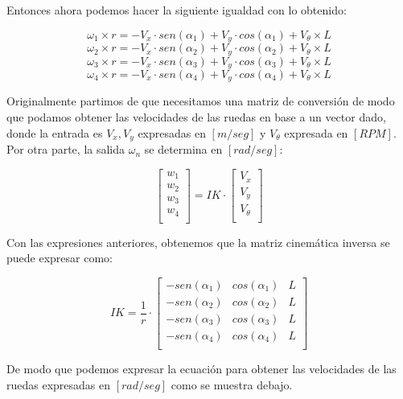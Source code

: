 Entonces ahora podemos hacer la siguiente igualdad con lo obtenido:

$$ \omega_1 \times r = -V_x \cdot sen(\alpha_1) + V_y \cdot cos(\alpha_1) + V_\theta \times L $$
$$ \omega_2 \times r = -V_x \cdot sen(\alpha_2) + V_y \cdot cos(\alpha_2) + V_\theta \times L $$
$$ \omega_3 \times r = -V_x \cdot sen(\alpha_3) + V_y \cdot cos(\alpha_3) + V_\theta \times L $$
$$ \omega_4 \times r = -V_x \cdot sen(\alpha_4) + V_y \cdot cos(\alpha_4) + V_\theta \times L $$

Originalmente partimos de que necesitamos una matriz de conversión de modo que podamos obtener las velocidades de las ruedas en base a un vector dado, donde la entrada es $V_x, V_y$ expresadas en $[m/seg]$ y $V_\theta$ expresada en $[RPM]$. Por otra parte, la salida $\omega_n$ se determina en $[rad/seg]$:

$$ \begin{bmatrix} w_1 \\ w_2 \\ w_3 \\ w_4 \\ \end{bmatrix} = IK \cdot \begin{bmatrix} V_x \\ V_y \\ V_\theta \\ \end{bmatrix} $$

Con las expresiones anteriores, obtenemos que la matriz cinemática inversa se puede expresar como:

$$ IK = 
    \frac{1}{r}
    \cdot
    \begin{bmatrix}
        {-sen(\alpha_1)} & {cos(\alpha_1)} & L \\
        {-sen(\alpha_2)} & {cos(\alpha_2)} & L \\
        {-sen(\alpha_3)} & {cos(\alpha_3)} & L \\
        {-sen(\alpha_4)} & {cos(\alpha_4)} & L \\
    \end{bmatrix} $$

De modo que podemos expresar la ecuación para obtener las velocidades de las ruedas expresadas en $[rad/seg]$ como se muestra debajo.

